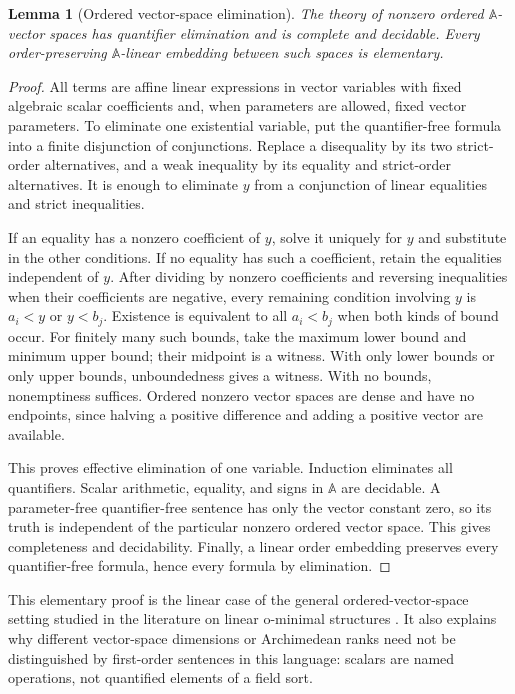 \documentclass[11pt,letterpaper]{article}
\numberwithin{equation}{section}
\newtheorem{lemma}[lemma]{Lemma}
\theoremstyle{definition}
\theoremstyle{remark}
\newcommand{\A}{\mathbb A}
\begin{document}
\begin{lemma}[Ordered vector-space elimination]\label{exr:lem:vectorQE}
The theory of nonzero ordered $\A$-vector spaces has quantifier elimination and
is complete and decidable. Every order-preserving $\A$-linear embedding between
such spaces is elementary.
\end{lemma}
\begin{proof}
All terms are affine linear expressions in vector variables with fixed algebraic
scalar coefficients and, when parameters are allowed, fixed vector parameters.
To eliminate one existential variable, put the quantifier-free formula into a
finite disjunction of conjunctions. Replace a disequality by its two strict-order
alternatives, and a weak inequality by its equality and strict-order alternatives.
It is enough to eliminate $y$ from a conjunction of linear equalities and strict
inequalities.

If an equality has a nonzero coefficient of $y$, solve it uniquely for $y$ and
substitute in the other conditions. If no equality has such a coefficient,
retain the equalities independent of $y$. After dividing by nonzero coefficients
and reversing inequalities when their coefficients are negative, every remaining
condition involving $y$ is $a_i<y$ or $y<b_j$. Existence is equivalent to all
$a_i<b_j$ when both kinds of bound occur. For finitely many such bounds, take the
maximum lower bound and minimum upper bound; their midpoint is a witness. With
only lower bounds or only upper bounds, unboundedness gives a witness. With no
bounds, nonemptiness suffices. Ordered nonzero vector spaces are dense and have
no endpoints, since halving a positive difference and adding a positive vector
are available.

This proves effective elimination of one variable. Induction eliminates all
quantifiers. Scalar arithmetic, equality, and signs in $\A$ are decidable. A
parameter-free quantifier-free sentence has only the vector constant zero, so its
truth is independent of the particular nonzero ordered vector space. This gives
completeness and decidability. Finally, a linear order embedding preserves every
quantifier-free formula, hence every formula by elimination.
\end{proof}

This elementary proof is the linear case of the general ordered-vector-space
setting studied in the literature on linear o-minimal structures
\cite{loveys-peterzil}. It also explains why different vector-space dimensions or
Archimedean ranks need not be distinguished by first-order sentences in this
language: scalars are named operations, not quantified elements of a field sort.
\end{document}
